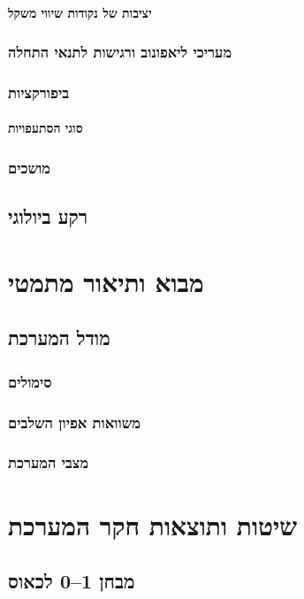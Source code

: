 \documentclass{article}
\begin{document}
\paragraph{יציבות של נקודות שיווי משקל}
\subsubsection{מעריכי ליאפונוב ורגישות לתנאי התחלה}
\subsubsection{ביפורקציות}
\paragraph{סוגי הסתעפויות}
\subsubsection{מושכים}
\subsection{רקע ביולוגי}

\newpage
\section{מבוא ותיאור מתמטי}
\setcounter{subsection}{3}
\subsection{מודל המערכת}
\subsubsection{סימולים}
\subsubsection{משוואות אפיון השלבים}
\subsubsection{מצבי המערכת}

\newpage
\section{שיטות ותוצאות חקר המערכת}
\setcounter{subsection}{4}
\subsection{מבחן 1–0 לכאוס}
\end{document}
